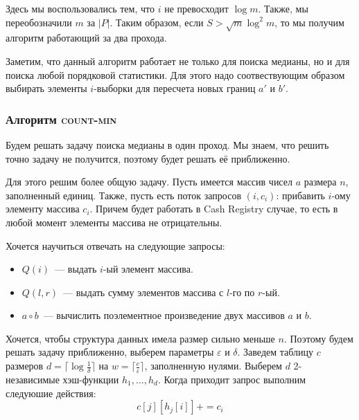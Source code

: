 \documentclass{article}
\renewcommand{\epsilon}{\varepsilon}
\begin{document}
Здесь мы воспользовались тем, что $i$ не превосходит $\log m$.
Также, мы переобозначили $m$ за $|P|$. Таким образом, если $S > \sqrt{m} \log^2 m$,
то мы получим алгоритм работающий за два прохода.

Заметим, что данный алгоритм работает не только для поиска медианы, но и для
поиска любой порядковой статистики. Для этого надо соотвествующим образом выбирать
элементы $i$-выборки для пересчета новых границ $a'$ и $b'$.


\subsubsection{Алгоритм \textsc{count-min}}
Будем решать задачу поиска медианы в один проход. Мы знаем, что решить
точно задачу не получится, поэтому будет решать её приближенно.

Для этого решим более общую задачу. Пусть имеется массив чисел $a$
размера $n$, заполненный единиц. Также, пусть есть поток запросов $(i, c_i)$:
прибавить $i$-ому элементу массива $c_i$.
Причем будет работать в Cash Registry случае, то есть в любой момент
элементы массива не отрицательны.

Хочется научиться отвечать на следующие запросы:
\begin{itemize}
\item
$Q(i)$~--- выдать $i$-ый элемент массива.

\item
$Q(l, r)$~--- выдать сумму элементов массива с $l$-го по $r$-ый.

\item
$a \circ b$~--- вычислить поэлементное произведение двух массивов $a$ и $b$.
\end{itemize}

Хочется, чтобы структура данных имела размер сильно меньше $n$.
Поэтому будем решать задачу приближенно, выберем параметры $\epsilon$ и $\delta$.
Заведем таблицу $c$ размеров 
$d = \lceil \log \frac{1}{\delta} \rceil$ на
$w = \lceil \frac{e}{\epsilon} \rceil$, заполненную нулями.
Выберем $d$ 2-независимые хэш-функции $h_1, \ldots, h_d$.
Когда приходит запрос выполним следуюшие действия:
$$
c[j][h_j[i]] += c_i
$$
\end{document}
